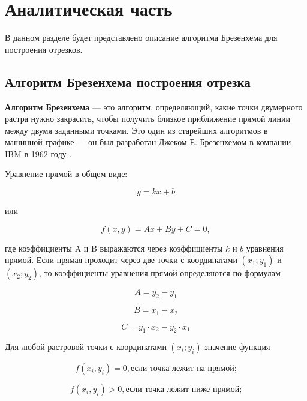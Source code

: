 \chapter{Аналитическая часть}
В данном разделе будет представлено описание алгоритма Брезенхема для построения отрезков.

\section{Алгоритм Брезенхема построения отрезка}
\textbf{Алгоритм Брезенхема} --- это алгоритм, определяющий, какие точки двумерного растра нужно закрасить, чтобы получить близкое приближение прямой линии между двумя заданными точками. Это один из старейших алгоритмов в машинной графике --- он был разработан Джеком Е. Брезенхемом в компании IBM в 1962 году \cite{brez_def}.

Уравнение прямой в общем виде:

\begin{equation}
	y=kx+b
\end{equation}

или

\begin{equation}
	f(x,y)=Ax+By+C=0,
\end{equation}

где коэффициенты A и B выражаются через коэффициенты $k$ и $b$ уравнения прямой. Если прямая проходит через две точки с координатами $(x_{1};y_{1})$ и $(x_{2};y_{2})$, то коэффициенты уравнения прямой определяются по формулам

\begin{equation}
	A=y_{2}-y_{1}
\end{equation}

\begin{equation}
	B=x_{1}-x_{2}
\end{equation}

\begin{equation}
	C=y_{1} \cdot x_{2}-y_{2} \cdot x_{1}
\end{equation}

Для любой растровой точки с координатами $(x_{i};y_{i})$ значение функция

\begin{equation}
	f(x_{i},y_{i}) = 0, \text{если точка лежит на прямой;}
\end{equation}

\begin{equation}
	f(x_{i},y_{i}) > 0, \text{если точка лежит ниже прямой;}
\end{equation}
	
